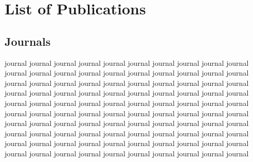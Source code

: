 \documentclass[12pt,a4paper,oneside,onecolumn,fleqn,dvipdfmx,report]{jsbook}
\begin{document}
\chapter{List of Publications}

\section*{Journals}
journal journal journal journal journal journal journal journal journal journal journal journal journal journal journal journal journal journal journal journal journal journal journal journal journal journal journal journal journal journal journal journal journal journal journal journal journal journal journal journal journal journal journal journal journal journal journal journal journal journal journal journal journal journal journal journal journal journal journal journal journal journal journal journal journal journal journal journal journal journal journal journal journal journal journal journal journal journal journal journal journal journal journal journal journal journal journal journal journal journal journal journal journal journal journal journal journal journal journal journal
\end{document}
